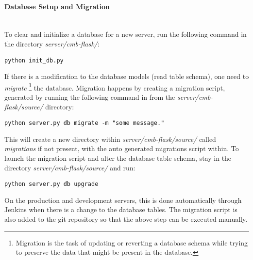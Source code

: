 \paragraph*{Database Setup and Migration} \hfill \\
To clear and initialize a database for a new server, run the following command in the directory \textit{server/cmb-flask/}:
\begin{lstlisting}
python init_db.py
\end{lstlisting}
If there is a modification to the database models (read table schema), one need to \textit{migrate} \footnote{Migration is the task of updating or reverting a database schema while trying to preserve the data that might be present in the database.} the database. Migration happens by creating a migration script, generated by running the following command in from the \textit{server/cmb-flask/source/} directory:
\begin{lstlisting}
python server.py db migrate -m "some message."
\end{lstlisting}
This will create a new directory within \textit{server/cmb-flask/source/} called \textit{migrations} if not present, with the auto generated migrations script within. To launch the migration script and alter the database table schema, stay in the directory \textit{server/cmb-flask/source/} and run:
\begin{lstlisting}
python server.py db upgrade
\end{lstlisting}
On the production and development servers, this is done automatically through Jenkins when there is a change to the database tables. The migration script is also added to the git repository so that the above step can be executed manually. \\


